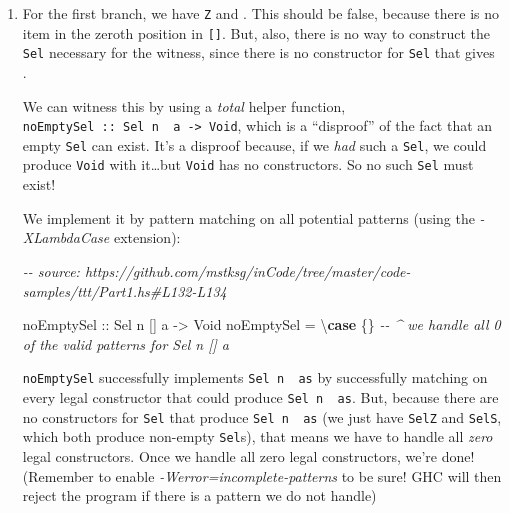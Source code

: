 \documentclass[]{article}
\newenvironment{Shaded}{}{}
\newcommand{\CommentTok}[1]{\textcolor[rgb]{0.38,0.63,0.69}{\textit{#1}}}
\newcommand{\DataTypeTok}[1]{\textcolor[rgb]{0.56,0.13,0.00}{#1}}
\newcommand{\KeywordTok}[1]{\textcolor[rgb]{0.00,0.44,0.13}{\textbf{#1}}}
\newcommand{\NormalTok}[1]{#1}
\newcommand{\OtherTok}[1]{\textcolor[rgb]{0.00,0.44,0.13}{#1}}
\begin{document}
\begin{enumerate}
\def\labelenumi{\arabic{enumi}.}
\item
  For the first branch, we have \texttt{\textquotesingle{}Z} and
  \texttt{\textquotesingle{}{[}{]}}. This should be false, because there is no
  item in the zeroth position in \texttt{{[}{]}}. But, also, there is no way to
  construct the \texttt{Sel} necessary for the witness, since there is no
  constructor for \texttt{Sel} that gives \texttt{\textquotesingle{}{[}{]}}.

  We can witness this by using a \emph{total} helper function,
  \texttt{noEmptySel\ ::\ Sel\ n\ \textquotesingle{}{[}{]}\ a\ -\textgreater{}\ Void},
  which is a ``disproof'' of the fact that an empty \texttt{Sel} can exist. It's
  a disproof because, if we \emph{had} such a \texttt{Sel}, we could produce
  \texttt{Void} with it\ldots but \texttt{Void} has no constructors. So no such
  \texttt{Sel} must exist!

  We implement it by pattern matching on all potential patterns (using the
  \emph{-XLambdaCase} extension):

\begin{Shaded}
\begin{Highlighting}[]
\CommentTok{{-}{-} source: https://github.com/mstksg/inCode/tree/master/code{-}samples/ttt/Part1.hs\#L132{-}L134}

\OtherTok{noEmptySel ::} \DataTypeTok{Sel}\NormalTok{ n \textquotesingle{}[] a }\OtherTok{{-}\textgreater{}} \DataTypeTok{Void}
\NormalTok{noEmptySel }\OtherTok{=}\NormalTok{ \textbackslash{}}\KeywordTok{case}\NormalTok{ \{\}}
            \CommentTok{{-}{-} \^{} we handle all 0 of the valid patterns for Sel n \textquotesingle{}[] a}
\end{Highlighting}
\end{Shaded}

  \texttt{noEmptySel} successfully implements
  \texttt{Sel\ n\ \textquotesingle{}{[}{]}\ as} by successfully matching on
  every legal constructor that could produce
  \texttt{Sel\ n\ \textquotesingle{}{[}{]}\ as}. But, because there are no
  constructors for \texttt{Sel} that produce
  \texttt{Sel\ n\ \textquotesingle{}{[}{]}\ as} (we just have \texttt{SelZ} and
  \texttt{SelS}, which both produce non-empty \texttt{Sel}s), that means we have
  to handle all \emph{zero} legal constructors. Once we handle all zero legal
  constructors, we're done! (Remember to enable
  \emph{-Werror=incomplete-patterns} to be sure! GHC will then reject the
  program if there is a pattern we do not handle)


\end{enumerate}
\end{document}
